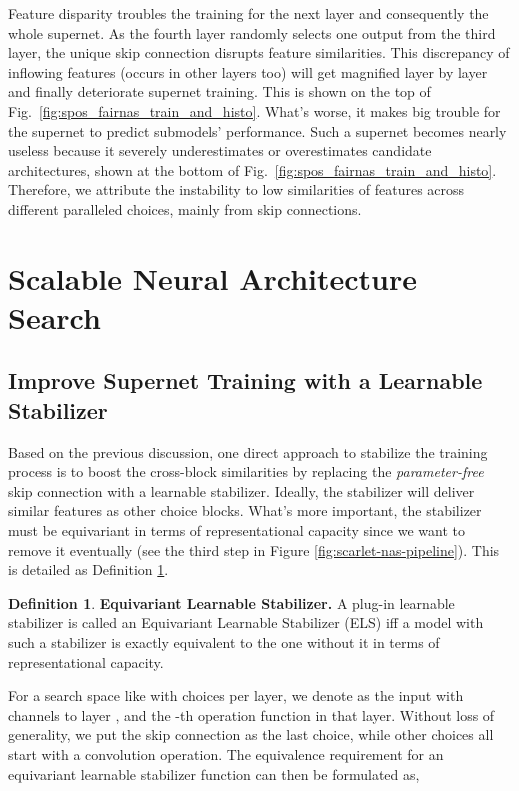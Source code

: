 \documentclass[10pt,twocolumn,letterpaper]{article}
\theoremstyle{definition}
\newtheorem{definition}{Definition}[section]
\begin{document}
Feature disparity troubles the training for the next layer and consequently the whole supernet. As the fourth layer randomly selects one output from the third layer, the unique skip connection disrupts feature similarities. This discrepancy of inflowing features (occurs in other layers too) will get magnified layer by layer and finally deteriorate supernet training. This is shown on the top of Fig.~\ref{fig:spos_fairnas_train_and_histo}. What's worse, it makes big trouble for the supernet to predict submodels' performance. Such a supernet becomes nearly useless because it severely underestimates or overestimates candidate architectures, shown at the bottom of Fig.~\ref{fig:spos_fairnas_train_and_histo}. Therefore, we attribute the instability to low similarities of features across different paralleled choices, mainly from skip connections. 

\section{Scalable Neural Architecture Search}
\subsection{Improve Supernet Training with a Learnable Stabilizer}
Based on the previous discussion, one direct approach to stabilize the training process is to boost the cross-block similarities by replacing the \emph{parameter-free} skip connection with a learnable stabilizer. Ideally, the stabilizer will deliver similar features as other choice blocks. What's more important, the stabilizer must be equivariant in terms of representational capacity since we want to remove it eventually (see the third step in Figure \ref{fig:scarlet-nas-pipeline}). This is detailed as Definition \ref{def:els}.

\begin{definition}\label{def:els}
\textbf{Equivariant Learnable Stabilizer.}
A plug-in learnable stabilizer is called an Equivariant Learnable Stabilizer (ELS) iff a model with such a stabilizer is exactly equivalent to the one without it in terms of representational capacity.
\end{definition}

For a search space  like  with  choices per layer,  we denote  as the input with  channels to layer , and  the -th operation function in that layer. Without loss of generality, we put the skip connection as the last choice, while other choices all start with a convolution operation. The equivalence requirement for an equivariant learnable stabilizer function  can then be formulated as, 
\end{document}
